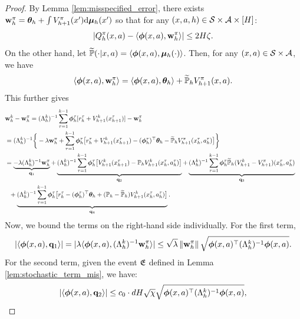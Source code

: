 \begin{proof}
By Lemma \ref{lem:misspecified_error}, there exists $\mathbf{w}^\pi_h = \bm{\theta}_h  + \int V^\pi_{h+1}(x') \mathrm{d} \bm{\mu}_h (x')$ so that
for any $(x, a, h) \in \mathcal{S}\times \mathcal{A} \times [H]$:
\begin{equation*}
|Q_h^\pi(x, a) - \langle\bm{\phi} (x, a),  \mathbf{w}^{\pi}_h\rangle| \le 2H\zeta.
\end{equation*}
On the other hand, let $\widetilde{\mathbb{P}}(\cdot|x, a) = \langle\bm{\phi}(x, a), \bm{\mu}_h(\cdot)\rangle$. Then, for any $(x, a) \in \mathcal{S} \times \mathcal{A}$, we have
\begin{equation*}
\langle \bm{\phi}(x, a), \mathbf{w}^\pi_h\rangle = \langle \bm{\phi}(x, a), \bm{\theta}_h\rangle + \widetilde{\mathbb{P}}_h V^\pi_{h+1}(x, a).
\end{equation*}
This further gives
\begin{align*}
\lefteqn{\w^k_h -  \w^\pi_h
= (\Lambda^k_h)^{-1} \sum_{\tau = 1}^{k-1} \bphi^\tau_h [r^\tau_h + V^{k}_{h+1}(x^\tau_{h+1})]- \w^\pi_h}  \\
&= (\Lambda^k_h)^{-1} \bigg \{-\lambda \w^\pi_h + \sum_{\tau = 1}^{k-1} \bphi^\tau_h \bigl [r^{\tau}_h + V^{k}_{h+1}(x^\tau_{h+1}) - (\bphi^\tau_h)\trans\btheta_h - \tilde{\P}_h \sind{V}{\pi}{h+1}(x_h^\tau, a_h^\tau) \bigl ] \bigg\} \\
&= \underbrace{-\lambda (\Lambda^k_h)^{-1} \w^\pi_h}_{\q_1} + 
\underbrace{(\Lambda^k_h)^{-1} \sum_{\tau = 1}^{k-1} \bphi^\tau_h \bigl  [V^{k}_{h+1}(x^\tau_{h+1}) - \P_h V^{k}_{h+1}(x_h^\tau, a_h^\tau) \bigr ]}_{\q_2} 
 + \underbrace{(\Lambda^k_h)^{-1}\sum_{\tau = 1}^{k-1} \bphi^\tau_h \tilde{\P}_h (V^{k}_{h+1} - V^\pi_{h+1})(x_h^\tau, a_h^\tau)}_{\q_3}\\
  & \ \ + \underbrace{(\Lambda^k_h)^{-1}\sum_{\tau = 1}^{k-1} \bphi^\tau_h  \bigl [r^{\tau}_h - (\bphi^\tau_h)\trans\btheta_h + (\P_h - \tilde{\P}_h) V^k_{h+1}(x_h^\tau, a_h^\tau) \bigr ]}_{\q_4}. 
\end{align*}
Now, we bound the terms on the right-hand side individually.
For the first term,
\begin{equation*}
|\langle \bm{\phi}(x, a), \mathbf{q}_1\rangle| = |\lambda \langle \bm{\phi}(x, a), (\Lambda^k_h)^{-1} \mathbf{w}^\pi_h\rangle|
\le \sqrt{\lambda} \left\|{\mathbf{w}_h^\pi}\right\| \sqrt{\bm{\phi}(x, a)^{\top} (\Lambda^k_h)^{-1}  \bm{\phi}(x, a)}. 
\end{equation*}
For the second term, given the event $\mathfrak{E}$ defined in Lemma \ref{lem:stochastic_term_mis}, we have:
\begin{equation*}
|\langle \bm{\phi}(x, a), \mathbf{q}_2\rangle| \le c_0 \cdot dH \sqrt{\chi} \sqrt{\bm{\phi}(x, a)^{\top} (\Lambda^k_h)^{-1}  \bm{\phi}(x, a)}, 
\end{equation*}

\end{proof}
